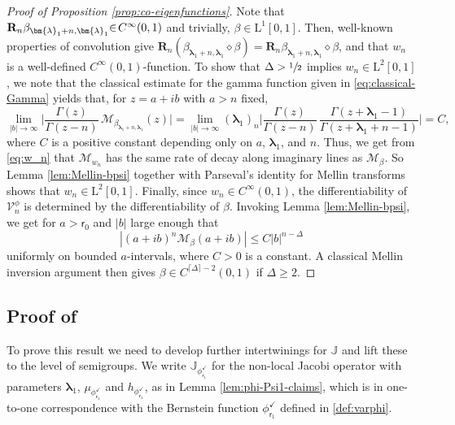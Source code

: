 \documentclass[10pt]{amsart}
\theoremstyle{plain}
\theoremstyle{definition}
\newcommand{\V}{\mathcal{V}}
\newcommand{\calM}{\mathcal{M}}
\newcommand{\Rc}{\mathbf{R}}
\newcommand{\calJ}{\mathds{J}}
\newcommand{\Leb}{\mathrm{L}}
\newcommand{\lam}{{\bm{\lambda}_1}}
\newcommand{\tet}{{\mathsf{r}_0}}
\newcommand{\vat}{{\mathsf{r}_1}}
\renewcommand{\varphi}{{\phi_{\vat}^{\checkmark}}}
\newcommand{\gab}[1][\lam,\mo]{{\beta_{#1}}}
\let\mo\mu
\let\bpsi\beta
\begin{document}
\begin{proof}[Proof of Proposition \ref{prop:co-eigenfunctions}]
Note that $\Rc_n \gab[\lam+n,\lam]\mkern-5mu\in\!C^\infty(0,1)$ and trivially, \hbox{$\bpsi\!\in\!\Leb^1[0,1]$}. Then, well-known properties of convolution give $\Rc_n\left( \gab[\lam+n,\lam] \diamond \bpsi\right) = \Rc_n \gab[\lam+n,\lam] \diamond \bpsi$, and that $w_n$ is a well-defined $C^\infty(0,1)$-function. To show that $\Delta > \sfrac{1}{2}$ implies $w_n \in \Leb^2[0,1]$, we note that the classical estimate for the gamma function given in \eqref{eq:classical-Gamma} yields that, for $z = a+ib$ with $a > n$ fixed,
\begin{equation*}
\lim_{|b| \to \infty} \biggl| \frac{\Gamma(z)}{\Gamma(z-n)}\, \calM_{\gab[\lam+n,\lam]}(z) \biggr| = \lim_{|b| \to \infty} (\lam)_n \biggl| \frac{\Gamma(z)}{\Gamma(z-n)}\,\frac{\Gamma(z+\lam-1)}{\Gamma(z+\lam+n-1)} \biggr| = C,
\end{equation*}
where $C$ is a positive constant depending only on $a$, $\lam$, and $n$. Thus, we get from \eqref{eq:w_n} that $\calM_{w_n}$ has the same rate of decay along imaginary lines as $\calM_{\bpsi}$. So Lemma \ref{lem:Mellin-bpsi} together with Parseval's identity for Mellin transforms shows that $w_n \in \Leb^2[0,1]$. Finally, since $w_n \in C^\infty(0,1)$, the differentiability of $\V_n^\phi$ is determined by the differentiability of $\bpsi$. Invoking Lemma \ref{lem:Mellin-bpsi}, we get for $a > \tet$ and $|b|$ large enough that
\begin{equation*}
\left| (a+ib)^n \calM_{\bpsi}(a+ib) \right| \leq C |b|^{n-\Delta}
\end{equation*}
uniformly on bounded $a$-intervals, where $C > 0$ is a constant.
A classical Mellin inversion argument then gives $\bpsi \in C^{\lceil \Delta \rceil - 2}(0,1)$
if $\Delta \ge 2$.
\end{proof}

\subsection{Proof of }

To prove this result we need to develop further inter\-twinings for $\calJ$ and lift these to the level of semigroups. We write $\calJ_\varphi$ for the non-local Jacobi operator with parameters $\lam$, $\mo_\varphi$ and $h_\varphi$, as in Lemma \ref{lem:phi-Psi1-claims}, which is in one-to-one correspondence with the Bernstein function $\varphi$ defined in \eqref{def:varphi}.
\end{document}

